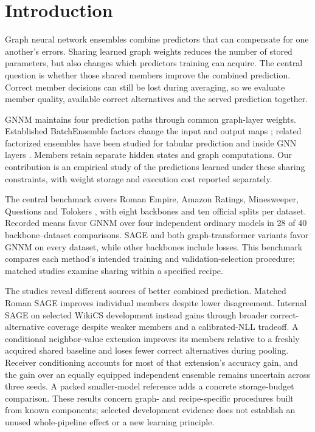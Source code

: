 \section{Introduction}
Graph neural network ensembles combine predictors that can compensate for one another's errors. Sharing learned graph weights reduces the number of stored parameters, but also changes which predictors training can acquire. The central question is whether those shared members improve the combined prediction. Correct member decisions can still be lost during averaging, so we evaluate member quality, available correct alternatives and the served prediction together.

GNNM maintains four prediction paths through common graph-layer weights. Established BatchEnsemble factors change the input and output maps \citep{wen2020batchensemble}; related factorized ensembles have been studied for tabular prediction \citep{gorishniy2025tabm} and inside GNN layers \citep{kim2023efficient}. Members retain separate hidden states and graph computations. Our contribution is an empirical study of the predictions learned under these sharing constraints, with weight storage and execution cost reported separately.

The central benchmark covers Roman Empire, Amazon Ratings, Minesweeper, Questions and Tolokers \citep{platonov2023critical}, with eight backbones and ten official splits per dataset. Recorded means favor GNNM over four independent ordinary models in 28 of 40 backbone--dataset comparisons. SAGE and both graph-transformer variants favor GNNM on every dataset, while other backbones include losses. This benchmark compares each method's intended training and validation-selection procedure; matched studies examine sharing within a specified recipe.

The studies reveal different sources of better combined prediction. Matched Roman SAGE improves individual members despite lower disagreement. Internal SAGE on selected WikiCS development instead gains through broader correct-alternative coverage despite weaker members and a calibrated-NLL tradeoff. A conditional neighbor-value extension improves its members relative to a freshly acquired shared baseline and loses fewer correct alternatives during pooling. Receiver conditioning accounts for most of that extension's accuracy gain, and the gain over an equally equipped independent ensemble remains uncertain across three seeds. A packed smaller-model reference adds a concrete storage-budget comparison. These results concern graph- and recipe-specific procedures built from known components; selected development evidence does not establish an unused whole-pipeline effect or a new learning principle.
